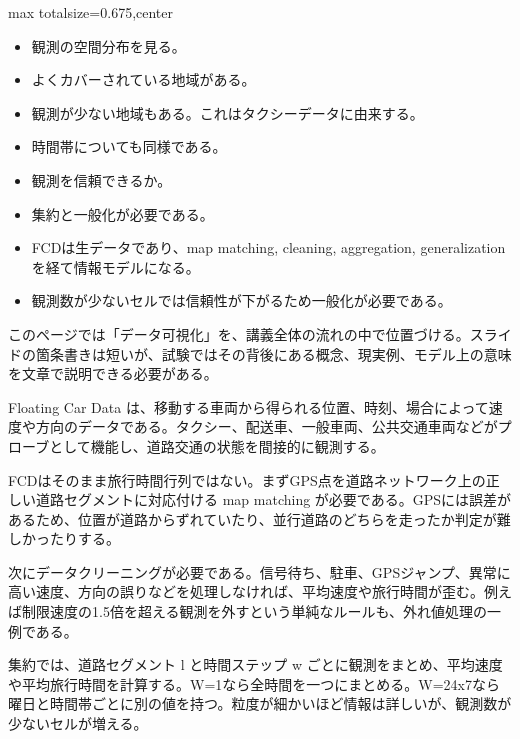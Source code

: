 \clearpage
{}
\begin{adjustbox}{max totalsize={\textwidth}{0.675\textheight},center}
\begin{minipage}{\textwidth}\scriptsize
\begin{minipage}[t]{0.485\textwidth}
\begin{itemize}
\item 観測の空間分布を見る。
\item よくカバーされている地域がある。
\item 観測が少ない地域もある。これはタクシーデータに由来する。
\item 時間帯についても同様である。
\item 観測を信頼できるか。
\item 集約と一般化が必要である。
\end{itemize}
\begin{itemize}
\item FCDは生データであり、map matching, cleaning, aggregation, generalization を経て情報モデルになる。
\item 観測数が少ないセルでは信頼性が下がるため一般化が必要である。
\end{itemize}
\end{minipage}\hfill
\begin{minipage}[t]{0.485\textwidth}
このページでは「データ可視化」を、講義全体の流れの中で位置づける。スライドの箇条書きは短いが、試験ではその背後にある概念、現実例、モデル上の意味を文章で説明できる必要がある。\par
Floating Car Data は、移動する車両から得られる位置、時刻、場合によって速度や方向のデータである。タクシー、配送車、一般車両、公共交通車両などがプローブとして機能し、道路交通の状態を間接的に観測する。\par
FCDはそのまま旅行時間行列ではない。まずGPS点を道路ネットワーク上の正しい道路セグメントに対応付ける map matching が必要である。GPSには誤差があるため、位置が道路からずれていたり、並行道路のどちらを走ったか判定が難しかったりする。\par
次にデータクリーニングが必要である。信号待ち、駐車、GPSジャンプ、異常に高い速度、方向の誤りなどを処理しなければ、平均速度や旅行時間が歪む。例えば制限速度の1.5倍を超える観測を外すという単純なルールも、外れ値処理の一例である。\par
集約では、道路セグメント l と時間ステップ w ごとに観測をまとめ、平均速度や平均旅行時間を計算する。W=1なら全時間を一つにまとめる。W=24x7なら曜日と時間帯ごとに別の値を持つ。粒度が細かいほど情報は詳しいが、観測数が少ないセルが増える。\par

\end{minipage}
\end{minipage}
\end{adjustbox}

